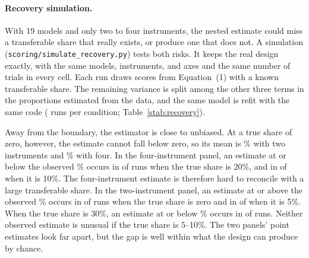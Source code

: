 \documentclass[12pt]{article}
\begin{document}
\paragraph{Recovery simulation.} With 19 models and only two to four instruments, the nested estimate could miss a transferable share
that really exists, or produce one that does not. A simulation (\texttt{scoring/simulate\_recovery.py}) tests both
risks. It keeps the real design exactly, with the same models, instruments, and axes and the same
number of trials in every cell. Each run draws scores from Equation~(1) with a known transferable share.
The remaining variance is split among the other three terms in the proportions estimated from the data,
and the same model is refit with the same code (\SimReps{} runs per condition; Table~\ref{stab:recovery}).

Away from the boundary, the estimator is close to unbiased. At a true share of zero, however, the
estimate cannot fall below zero, so its mean is \SimTwoZeroMean\% with two instruments and \SimFourZeroMean\% with four. In the
four-instrument panel, an estimate at or below the observed \NFourM\% occurs in \SimFourTwentyBelowN{} of \SimReps{} runs when the true
share is 20\%, and in \SimFourTenBelowN{} of \SimReps{} when it is 10\%. The four-instrument estimate is therefore hard to reconcile
with a large transferable share. In the two-instrument panel, an estimate at or above the observed \NTwoM\%
occurs in \SimTwoZeroAboveN{} of \SimReps{} runs when the true share is zero and in \SimTwoFiveAboveN{} of \SimReps{} when it is 5\%. When the true share is
30\%, an estimate at or below \NTwoM\% occurs in \SimTwoThirtyBelowN{} of \SimReps{} runs. Neither observed estimate is unusual if the
true share is 5--10\%. The two panels' point estimates look far apart, but the gap is well within what the
design can produce by chance.

\begin{table}[H]
\centering
\caption{Recovery of a known transferable (model) share by the nested REML
estimator on the real design, \SimReps{} simulated data sets per row. Entries
are percentages; the last two columns give the percentage of runs whose
estimate is below 1\% and at or below the estimate observed in the data
(\NTwoM\% with two instruments, \NFourM\% with four).}
\label{stab:recovery}
\footnotesize
\setlength{\tabcolsep}{3pt}

\end{table}
\end{document}
